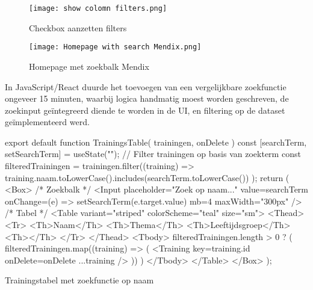 \begin{figure}[H]
    \centering
    \texttt{[image: show colomn filters.png]}
    \caption[\centering Checkbox aanzetten filters]{\label{fig:show-colomn-filters-Mendix} Checkbox aanzetten filters}
\end{figure}


\begin{figure}[H]
    \centering
    \texttt{[image: Homepage with search Mendix.png]}
    \caption[\centering Homepage with search bar]{\label{fig:homepage-with-search-Mendix} Homepage met zoekbalk Mendix}
\end{figure}



In JavaScript/React duurde het toevoegen van een vergelijkbare zoekfunctie ongeveer 15 minuten, waarbij logica handmatig moest worden geschreven, de zoekinput geïntegreerd diende te worden in de UI, en filtering op de dataset geïmplementeerd werd.

\begin{listing}[H]
        export default function TrainingsTable({ trainingen, onDelete }) {
            const [searchTerm, setSearchTerm] = useState("");
            // Filter trainingen op basis van zoekterm
            const filteredTrainingen = trainingen.filter((training) =>
            training.naam.toLowerCase().includes(searchTerm.toLowerCase())
            );
            return (
            <Box>
            {/* Zoekbalk */}
                <Input
                placeholder="Zoek op naam..."
                value={searchTerm}
                onChange={(e) => setSearchTerm(e.target.value)}
                mb={4}
                maxWidth="300px"
                />
            {/* Tabel */}
                <Table variant="striped" colorScheme="teal" size="sm">
                    <Thead>
                        <Tr>
                            <Th>Naam</Th>
                            <Th>Thema</Th>
                            <Th>Leeftijdsgroep</Th>
                            <Th></Th>
                        </Tr>
                    </Thead>
                    <Tbody>
                        {filteredTrainingen.length > 0 ? (
                         filteredTrainingen.map((training) => (
                            <Training key={training.id} onDelete={onDelete} {...training} />
                            ))
                        )}
                    </Tbody>
                </Table>
            </Box>
            );
        }
    \caption{Trainingstabel met zoekfunctie op naam}
    \label{lst:pipeline-clone}
\end{listing}

